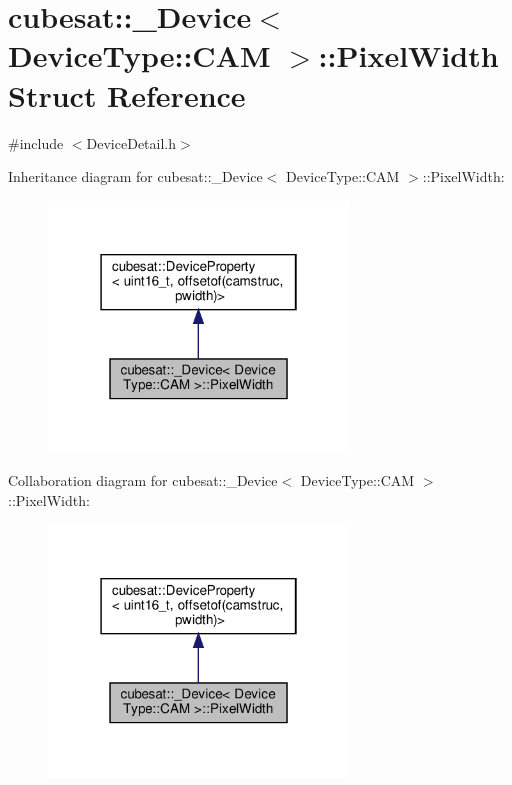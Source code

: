 \hypertarget{structcubesat_1_1__Device_3_01DeviceType_1_1CAM_01_4_1_1PixelWidth}{}\section{cubesat\+:\+:\+\_\+\+Device$<$ Device\+Type\+:\+:C\+AM $>$\+:\+:Pixel\+Width Struct Reference}
\label{structcubesat_1_1__Device_3_01DeviceType_1_1CAM_01_4_1_1PixelWidth}


{\ttfamily \#include $<$Device\+Detail.\+h$>$}



Inheritance diagram for cubesat\+:\+:\+\_\+\+Device$<$ Device\+Type\+:\+:C\+AM $>$\+:\+:Pixel\+Width\+:\nopagebreak
\begin{figure}[H]
\begin{center}
\leavevmode
\includegraphics[width=226pt]{structcubesat_1_1__Device_3_01DeviceType_1_1CAM_01_4_1_1PixelWidth__inherit__graph}
\end{center}
\end{figure}


Collaboration diagram for cubesat\+:\+:\+\_\+\+Device$<$ Device\+Type\+:\+:C\+AM $>$\+:\+:Pixel\+Width\+:\nopagebreak
\begin{figure}[H]
\begin{center}
\leavevmode
\includegraphics[width=226pt]{structcubesat_1_1__Device_3_01DeviceType_1_1CAM_01_4_1_1PixelWidth__coll__graph}
\end{center}
\end{figure}
